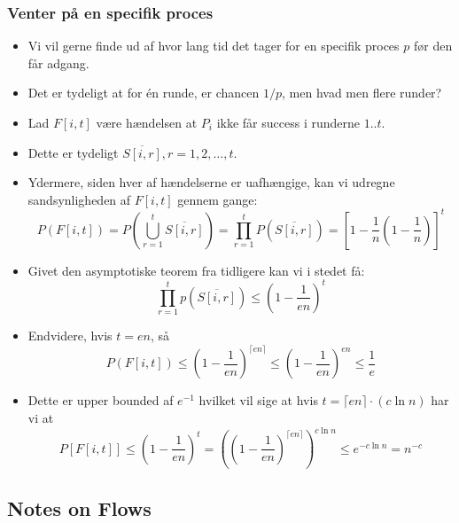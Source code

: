 \documentclass{beamer}
\begin{document}
\begin{frame}[allowframebreaks]
  \frametitle{Venter på en specifik proces}
  \begin{itemize}
  \item Vi vil gerne finde ud af hvor lang tid det tager for en specifik proces $p$ før den får adgang. 
  \item Det er tydeligt at for én runde, er chancen $1/p$, men hvad men flere runder? 
  \item Lad $F[i,t]$ være hændelsen at $P_i$ ikke får success i runderne $1..t$.
  \item Dette er tydeligt $\overline{S[i,r]}, r = 1, 2, \ldots, t$.
  \item Ydermere, siden hver af hændelserne er uafhængige, kan vi udregne sandsynligheden af $F[i,t]$ gennem gange: \[

      P(F[i,t]) =
      P( \bigcup\limits_{r=1}^{t} \overline{S[i,r]} )=
      \prod_{r=1}^{t}P(\overline{S[i,r]}) =
      \left[ 1 - \frac{1}{n} \left( 1 - \frac{1}{n} \right) \right]^{t}
      

    \]
    \item Givet den asymptotiske teorem fra tidligere kan vi i stedet få: \[ \prod_{r=1}^{t} p(\overline{S[i,r]}) \leq (1- \frac{1}{en})^{t} \]
    \item Endvidere, hvis $t = en$, så \[ P(F[i,t]) \leq \left( 1 - \frac{1}{en} \right)^{\lceil en \rceil} \leq \left( 1 - \frac{1}{en} \right)^{en} \leq \frac{1}{e} \]
    \item Dette er upper bounded af $e^{-1}$ hvilket vil sige at hvis $t = \lceil en \rceil \cdot (c \ln n)$ har vi at \[ P[F[i,t]] \leq \left( 1 - \frac{1}{en} \right)^{t} = \left( \left( 1 - \frac{1}{en}\right)^{\lceil en \rceil } \right)^{c \ln n} \leq e^{-c \ln n} = n^{-c} \]
  \end{itemize}
\end{frame}

\subsection{Notes on Flows}
\label{subsec:label}
\end{document}
